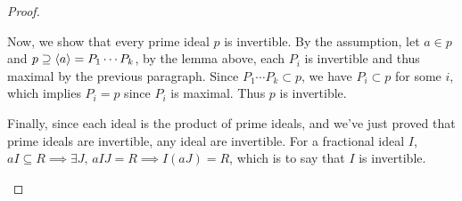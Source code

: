 \begin{theorem}
\begin{proof}
\begin{description}
        Now, we show that every prime ideal $p$ is invertible. By the assumption,
        let $a \in p$ and $p \supseteq \langle a\rangle = P_1 \dotsm P_k$, by the lemma above,
        each $P_i$ is invertible and thus maximal by the previous paragraph.
        Since $P_1 \dotsm P_k \subset p$, we have $P_i \subset p$ for some $i$,
        which implies $P_i = p$ since $P_i$ is maximal. Thus $p$ is invertible.

        Finally, since each ideal is the product of prime ideals,
        and we've just proved that prime ideals are invertible,
        any ideal are invertible. For a fractional ideal $I$,
        $aI \subseteq R \implies \exists J, \, aIJ = R \implies I(aJ) = R$,
        which is to say that $I$ is invertible.
        \qedhere
  \end{description}
  \end{proof}
\end{theorem}
